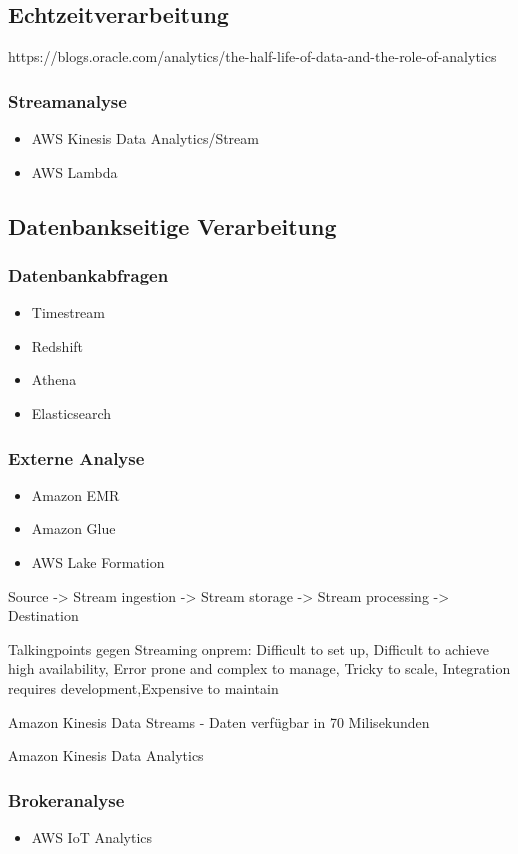 \subsection{Echtzeitverarbeitung}
https://blogs.oracle.com/analytics/the-half-life-of-data-and-the-role-of-analytics
\subsubsection{Streamanalyse}
\begin{itemize}
\item AWS Kinesis Data Analytics/Stream
\item AWS Lambda
\end{itemize}

\subsection{Datenbankseitige Verarbeitung}
\subsubsection{Datenbankabfragen}
\begin{itemize}
\item Timestream
\item Redshift
\item Athena
\item Elasticsearch
\end{itemize}

\subsubsection{Externe Analyse}
\begin{itemize}
\item Amazon EMR
\item Amazon Glue
\item AWS Lake Formation
\end{itemize}




Source -> Stream ingestion -> Stream storage -> Stream processing -> Destination

Talkingpoints gegen Streaming onprem:
Difficult to set up, Difficult to achieve high availability,
Error prone and complex to manage,
Tricky to scale, Integration requires development,Expensive to maintain

Amazon Kinesis Data Streams - Daten verfügbar in 70 Milisekunden



Amazon Kinesis Data Analytics


\subsubsection{Brokeranalyse}

\begin{itemize}
\item AWS IoT Analytics
\end{itemize}